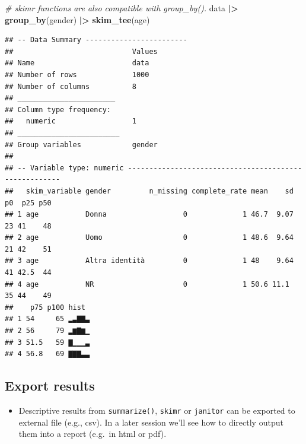 \documentclass[
]{book}
\newenvironment{Shaded}{\begin{snugshade}}{\end{snugshade}}
\newcommand{\CommentTok}[1]{\textcolor[rgb]{0.56,0.35,0.01}{\textit{#1}}}
\newcommand{\FunctionTok}[1]{\textcolor[rgb]{0.13,0.29,0.53}{\textbf{#1}}}
\newcommand{\NormalTok}[1]{#1}
\newcommand{\SpecialCharTok}[1]{\textcolor[rgb]{0.81,0.36,0.00}{\textbf{#1}}}
\providecommand{\tightlist}{%
  \setlength{\itemsep}{0pt}\setlength{\parskip}{0pt}}
\begin{document}
\begin{Shaded}
\begin{Highlighting}[]
\CommentTok{\# skimr functions are also compatible with group\_by().}
\NormalTok{data }\SpecialCharTok{|\textgreater{}} 
  \FunctionTok{group\_by}\NormalTok{(gender) }\SpecialCharTok{|\textgreater{}} 
  \FunctionTok{skim\_tee}\NormalTok{(age)}
\end{Highlighting}
\end{Shaded}

\begin{verbatim}
## -- Data Summary ------------------------
##                            Values
## Name                       data  
## Number of rows             1000  
## Number of columns          8     
## _______________________          
## Column type frequency:           
##   numeric                  1     
## ________________________         
## Group variables            gender
## 
## -- Variable type: numeric ------------------------------------------------------
##   skim_variable gender         n_missing complete_rate mean    sd p0  p25 p50
## 1 age           Donna                  0             1 46.7  9.07 23 41    48
## 2 age           Uomo                   0             1 48.6  9.64 21 42    51
## 3 age           Altra identità         0             1 48    9.64 41 42.5  44
## 4 age           NR                     0             1 50.6 11.1  35 44    49
##    p75 p100 hist 
## 1 54     65 ▂▃▇▇▃
## 2 56     79 ▂▆▇▆▁
## 3 51.5   59 ▇▁▁▁▃
## 4 56.8   69 ▇▇▇▃▃
\end{verbatim}

\hypertarget{export-results}{%
\subsection{Export results}\label{export-results}}

\begin{itemize}
\tightlist
\item
  Descriptive results from \texttt{summarize()}, \texttt{skimr} or \texttt{janitor} can be exported to external file (e.g., csv). In a later session we'll see how to directly output them into a report (e.g.~in html or pdf).
\end{itemize}
\end{document}
